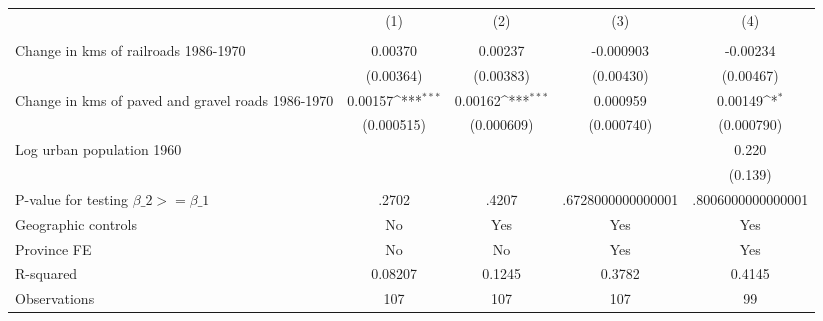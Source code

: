 {
\def\sym#1{\ifmmode^{#1}\else\(^{#1}\)\fi}
\begin{tabular}{l*{4}{c}}
\hline\hline
                &\multicolumn{1}{c}{(1)}&\multicolumn{1}{c}{(2)}&\multicolumn{1}{c}{(3)}&\multicolumn{1}{c}{(4)}\\
                &\multicolumn{1}{c}{}&\multicolumn{1}{c}{}&\multicolumn{1}{c}{}&\multicolumn{1}{c}{}\\
\hline
Change in kms of railroads 1986-1970&  0.00370         &  0.00237         &-0.000903         & -0.00234         \\
                &(0.00364)         &(0.00383)         &(0.00430)         &(0.00467)         \\
[1em]
Change in kms of paved and gravel roads 1986-1970&  0.00157\sym{***}&  0.00162\sym{***}& 0.000959         &  0.00149\sym{*}  \\
                &(0.000515)         &(0.000609)         &(0.000740)         &(0.000790)         \\
[1em]
Log urban population 1960&                  &                  &                  &    0.220         \\
                &                  &                  &                  &  (0.139)         \\
\hline
P-value for testing $\beta\_{2} >= \beta\_{1}$&    .2702         &    .4207         &.6728000000000001         &.8006000000000001         \\
Geographic controls&       No         &      Yes         &      Yes         &      Yes         \\
Province FE     &       No         &       No         &      Yes         &      Yes         \\
R-squared       &  0.08207         &   0.1245         &   0.3782         &   0.4145         \\
Observations    &      107         &      107         &      107         &       99         \\
\hline\hline
\end{tabular}
}
